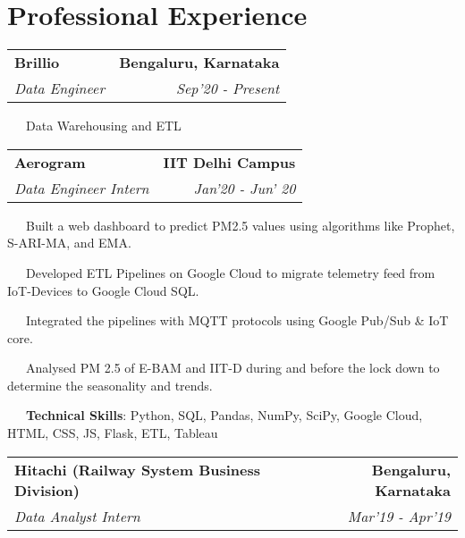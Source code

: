\documentclass[a4paper,20pt]{article}
\makeatletter
\newcommand{\resumeSubheading}[4]{
  \vspace{-1pt}\item
    \begin{tabular*}{0.97\textwidth}{l@{\extracolsep{\fill}}r}
      \textbf{#1} & #2 \\
      \textit{#3} & \textit{#4} \\
    \end{tabular*}\vspace{-5pt}
}
\makeatother
\begin{document}
\section{Professional Experience}
  \resumeSubheading
      {\textbf{Brillio}}{\textbf{Bengaluru, Karnataka}}
      {Data Engineer}{Sep'20 - Present}
    \resumeSubHeadingEnd
     \begin{description}[font=$\bullet$]
        \item {~~~}{Data Warehousing and ETL}
        \vspace{-5pt}
    \end{description}
\vspace{-5pt}
  \resumeSubheading
      {\textbf{Aerogram }}{\textbf{IIT Delhi Campus}}
      {Data Engineer Intern}{Jan'20 - Jun' 20}
    \resumeSubHeadingEnd
     \begin{description}[font=$\bullet$]
        \item {~~~}{Built a web dashboard to predict PM2.5 values using algorithms like Prophet, S-ARI-MA, and EMA.}
        \vspace{-5pt}
        \item {~~~}{Developed ETL Pipelines on Google Cloud to migrate telemetry feed from IoT-Devices to Google Cloud SQL.}
        \vspace{-5pt}
        \item {~~~}{Integrated the pipelines with MQTT protocols using Google Pub/Sub \& IoT core.}
        \vspace{-5pt}
        \item {~~~}{Analysed PM 2.5 of E-BAM and IIT-D during and before the lock down to determine the seasonality and trends.}
        \vspace{-5pt}
        \item {~~~}{\textbf{Technical Skills}: Python, SQL, Pandas, NumPy, SciPy, Google Cloud, HTML, CSS, JS, Flask, ETL, Tableau}
        
    \end{description}
\vspace{-5pt}
    \resumeSubheading
      {\textbf{Hitachi (Railway System Business Division)}}{\textbf{Bengaluru, Karnataka}}
      {Data Analyst Intern}{Mar'19 - Apr'19}
    \resumeSubHeadingEnd
\end{document}
